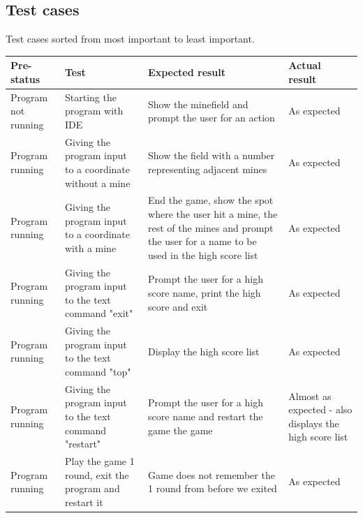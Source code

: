 \documentclass[UKenglish]{article}  %
\begin{document}
\subsection{Test cases} Test cases sorted from most important to least
important.

\begin{table}[H]
    \centering
    \begin{tabular}{| m{1.5in} |  m{1.5in}  | m{1.5in} | m{0.75in} |}
        \hline

        \textbf{Pre-status} & \textbf{Test} &
        \textbf{Expected result} & \textbf{Actual result} \\ \hline

        Program not running & Starting the program with IDE & Show the minefield
        and prompt the user for an action  & As expected \\ \hline

        Program running & Giving the program input to a coordinate without a
        mine & Show the field with a number representing adjacent mines & As
        expected \\ \hline

        Program running & Giving the program input to a coordinate with a mine &
        End the game, show the spot where the user hit a mine, the rest of the
        mines and prompt the user for a name to be used in the high score list &
        As expected \\ \hline

        Program running & Giving the program input to the text command "exit" &
        Prompt the user for a high score name, print the high score and exit &
        As expected \\ \hline

        Program running & Giving the program input to the text command "top" &
        Display the high score list & As expected \\ \hline

        Program running & Giving the program input to the text command "restart"
        & Prompt the user for a high score name and restart the game the game &
        Almost as expected - also displays the high score list \\ \hline

        Program running & Play the game 1 round, exit the program and restart it
        & Game does not remember the 1 round from before we exited & As expected
        \\ \hline


\end{tabular}
\end{table}
\end{document}
